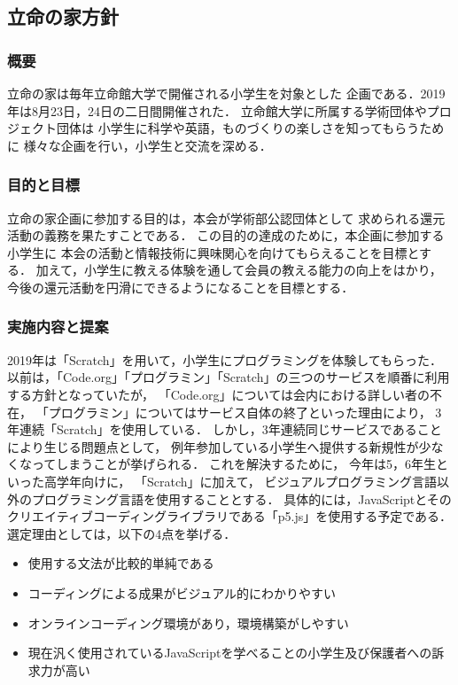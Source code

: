\subsection*{立命の家方針}


\subsubsection*{概要}
立命の家は毎年立命館大学で開催される小学生を対象とした
企画である．2019年は8月23日，24日の二日間開催された．
立命館大学に所属する学術団体やプロジェクト団体は
小学生に科学や英語，ものづくりの楽しさを知ってもらうために
様々な企画を行い，小学生と交流を深める．

\subsubsection*{目的と目標}
立命の家企画に参加する目的は，本会が学術部公認団体として
求められる還元活動の義務を果たすことである．
この目的の達成のために，本企画に参加する小学生に
本会の活動と情報技術に興味関心を向けてもらえることを目標とする．
加えて，小学生に教える体験を通して会員の教える能力の向上をはかり，
今後の還元活動を円滑にできるようになることを目標とする．

\subsubsection*{実施内容と提案}
2019年は「Scratch」を用いて，小学生にプログラミングを体験してもらった．
以前は，「Code.org」「プログラミン」「Scratch」の三つのサービスを順番に利用する方針となっていたが，
「Code.org」については会内における詳しい者の不在，
「プログラミン」についてはサービス自体の終了といった理由により，
3年連続「Scratch」を使用している．
しかし，3年連続同じサービスであることにより生じる問題点として，
例年参加している小学生へ提供する新規性が少なくなってしまうことが挙げられる．
これを解決するために，
今年は5，6年生といった高学年向けに，
「Scratch」に加えて，
ビジュアルプログラミング言語以外のプログラミング言語を使用することとする．
具体的には，JavaScriptとそのクリエイティブコーディングライブラリである「p5.js」を使用する予定である．
選定理由としては，以下の4点を挙げる．

\begin {itemize}
    \item 使用する文法が比較的単純である
    \item コーディングによる成果がビジュアル的にわかりやすい
    \item オンラインコーディング環境があり，環境構築がしやすい
    \item 現在汎く使用されているJavaScriptを学べることの小学生及び保護者への訴求力が高い
\end {itemize}

